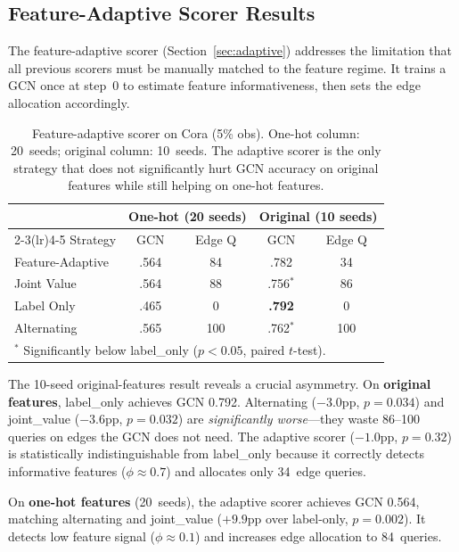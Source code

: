 \documentclass[12pt,a4paper,oneside]{report}
\begin{document}
\subsection{Feature-Adaptive Scorer Results}
\label{sec:adaptive_results}

The feature-adaptive scorer (Section~\ref{sec:adaptive}) addresses the limitation that all previous scorers must be manually matched to the feature regime. It trains a GCN once at step~0 to estimate feature informativeness, then sets the edge allocation accordingly.

\begin{table}[htbp]
\centering
\caption{Feature-adaptive scorer on Cora (5\% obs). One-hot column: 20~seeds; original column: 10~seeds. The adaptive scorer is the only strategy that does not significantly hurt GCN accuracy on original features while still helping on one-hot features.}
\label{tab:adaptive}
\small
\begin{tabular}{l@{\hskip 4pt}cc@{\hskip 8pt}cc}
\toprule
 & \multicolumn{2}{c}{One-hot (20 seeds)} & \multicolumn{2}{c}{Original (10 seeds)} \\
\cmidrule(lr){2-3}\cmidrule(lr){4-5}
Strategy & GCN & Edge Q & GCN & Edge Q \\
\midrule
Feature-Adaptive & .564 & 84 & .782 & 34 \\
Joint Value      & .564 & 88 & .756$^{*}$ & 86 \\
Label Only       & .465 & 0  & \textbf{.792} & 0 \\
Alternating      & .565 & 100 & .762$^{*}$ & 100 \\
\bottomrule
\multicolumn{5}{l}{\footnotesize $^{*}$ Significantly below label\_only ($p < 0.05$, paired $t$-test).}
\end{tabular}
\end{table}

The 10-seed original-features result reveals a crucial asymmetry. On \textbf{original features}, label\_only achieves GCN 0.792. Alternating ($-3.0$pp, $p = 0.034$) and joint\_value ($-3.6$pp, $p = 0.032$) are \emph{significantly worse}---they waste 86--100 queries on edges the GCN does not need. The adaptive scorer ($-1.0$pp, $p = 0.32$) is statistically indistinguishable from label\_only because it correctly detects informative features ($\phi \approx 0.7$) and allocates only 34~edge queries.

On \textbf{one-hot features} (20~seeds), the adaptive scorer achieves GCN 0.564, matching alternating and joint\_value ($+9.9$pp over label-only, $p = 0.002$). It detects low feature signal ($\phi \approx 0.1$) and increases edge allocation to 84~queries.
\end{document}
